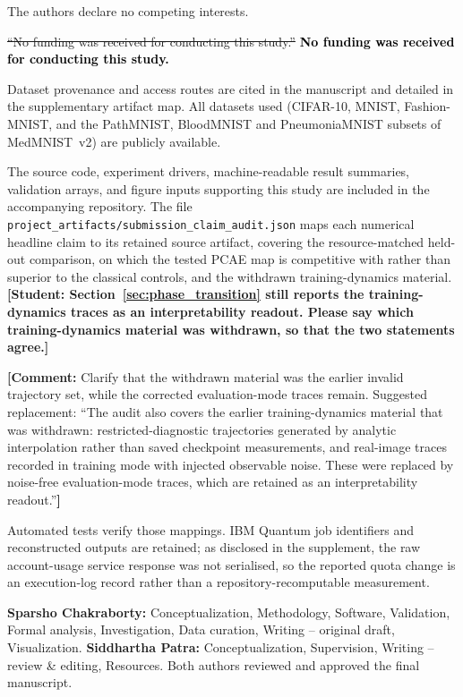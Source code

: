 \documentclass[pdflatex,sn-basic]{sn-jnl}
\newcommand{\del}[1]{\sout{#1}}
\newcommand{\add}[1]{\textbf{\textcolor{black}{#1}}}
\newcommand{\yellowcomment}[1]{%
  \par\smallskip\noindent
  \begingroup\setlength{\fboxsep}{3pt}%
  \colorbox{yellow!35}{\parbox{\dimexpr\linewidth-2\fboxsep\relax}{\textbf{[Comment:} #1\textbf{]}}}%
  \endgroup\par\smallskip}
\begin{document}
\begin{description}\itemsep4pt
  \item[Competing interests.] The authors declare no competing interests.

  \item[Funding.] \del{``No funding was received for conducting this study.''} \add{No funding was received for conducting this study.}

  \item[Data availability.] Dataset provenance and access routes are cited in the
        manuscript and detailed in the supplementary artifact map. All datasets
        used (CIFAR-10, MNIST, Fashion-MNIST, and the PathMNIST, BloodMNIST and
        PneumoniaMNIST subsets of MedMNIST~v2) are publicly available.

  \item[Code availability.] The source code, experiment drivers,
        machine-readable result summaries, validation arrays, and figure inputs
        supporting this study are included in the accompanying repository. The
        file \texttt{project\_artifacts/submission\_claim\_audit.json} maps each
        numerical headline claim to its retained source artifact, covering the
        resource-matched held-out comparison, on which the tested PCAE map is
        competitive with rather than superior to the classical controls, and the
        withdrawn training-dynamics material. {\color{red}\textbf{[Student:
Section~\ref{sec:phase_transition} still reports the training-dynamics traces as
an interpretability readout. Please say which training-dynamics material was
withdrawn, so that the two statements agree.]}}
\yellowcomment{Clarify that the withdrawn material was the earlier invalid trajectory set, while the corrected evaluation-mode traces remain. Suggested replacement: ``The audit also covers the earlier training-dynamics material that was withdrawn: restricted-diagnostic trajectories generated by analytic interpolation rather than saved checkpoint measurements, and real-image traces recorded in training mode with injected observable noise. These were replaced by noise-free evaluation-mode traces, which are retained as an interpretability readout.''}
 Automated tests verify those
        mappings.
        IBM Quantum job identifiers and reconstructed outputs are retained; as
        disclosed in the supplement, the raw account-usage service response was
        not serialised, so the reported quota change is an execution-log record
        rather than a repository-recomputable measurement.

  \item[Author contributions.] \textbf{Sparsho Chakraborty:}
        Conceptualization, Methodology, Software, Validation, Formal analysis,
        Investigation, Data curation, Writing -- original draft, Visualization.
        \textbf{Siddhartha Patra:} Conceptualization, Supervision, Writing --
        review \& editing, Resources. Both authors reviewed and approved the
        final manuscript.
\end{description}

% 

\end{document}
